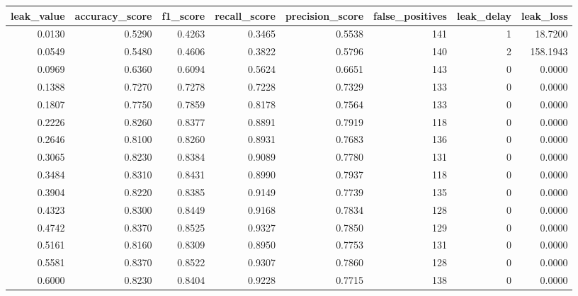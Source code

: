 \begin{tabular}{rrrrrrrr}
\toprule
leak\_value & accuracy\_score & f1\_score & recall\_score & precision\_score & false\_positives & leak\_delay & leak\_loss \\
\midrule
0.0130 & 0.5290 & 0.4263 & 0.3465 & 0.5538 & 141 & 1 & 18.7200 \\
0.0549 & 0.5480 & 0.4606 & 0.3822 & 0.5796 & 140 & 2 & 158.1943 \\
0.0969 & 0.6360 & 0.6094 & 0.5624 & 0.6651 & 143 & 0 & 0.0000 \\
0.1388 & 0.7270 & 0.7278 & 0.7228 & 0.7329 & 133 & 0 & 0.0000 \\
0.1807 & 0.7750 & 0.7859 & 0.8178 & 0.7564 & 133 & 0 & 0.0000 \\
0.2226 & 0.8260 & 0.8377 & 0.8891 & 0.7919 & 118 & 0 & 0.0000 \\
0.2646 & 0.8100 & 0.8260 & 0.8931 & 0.7683 & 136 & 0 & 0.0000 \\
0.3065 & 0.8230 & 0.8384 & 0.9089 & 0.7780 & 131 & 0 & 0.0000 \\
0.3484 & 0.8310 & 0.8431 & 0.8990 & 0.7937 & 118 & 0 & 0.0000 \\
0.3904 & 0.8220 & 0.8385 & 0.9149 & 0.7739 & 135 & 0 & 0.0000 \\
0.4323 & 0.8300 & 0.8449 & 0.9168 & 0.7834 & 128 & 0 & 0.0000 \\
0.4742 & 0.8370 & 0.8525 & 0.9327 & 0.7850 & 129 & 0 & 0.0000 \\
0.5161 & 0.8160 & 0.8309 & 0.8950 & 0.7753 & 131 & 0 & 0.0000 \\
0.5581 & 0.8370 & 0.8522 & 0.9307 & 0.7860 & 128 & 0 & 0.0000 \\
0.6000 & 0.8230 & 0.8404 & 0.9228 & 0.7715 & 138 & 0 & 0.0000 \\
\bottomrule
\end{tabular}
